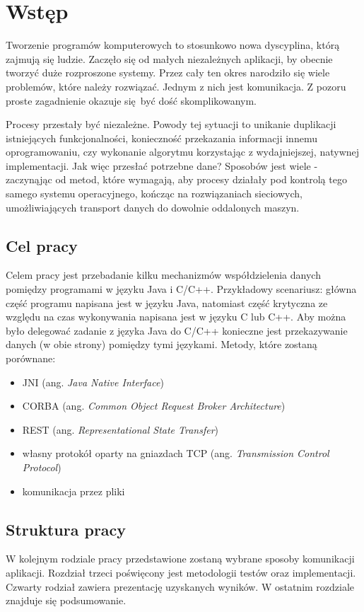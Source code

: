 \chapter{Wstęp}

Tworzenie programów komputerowych to stosunkowo nowa dyscyplina, którą zajmują się ludzie. Zaczęło się od małych niezależnych aplikacji, by obecnie tworzyć duże rozproszone systemy. Przez cały ten okres narodziło się wiele problemów, które należy rozwiązać. Jednym z nich jest komunikacja. Z pozoru proste zagadnienie okazuje się być dość skomplikowanym.

Procesy przestały być niezależne. Powody tej sytuacji to unikanie duplikacji istniejących funkcjonalności, konieczność przekazania informacji innemu oprogramowaniu, czy wykonanie algorytmu korzystając z wydajniejszej, natywnej implementacji. Jak więc przesłać potrzebne dane? Sposobów jest wiele - zaczynąjąc od metod, które wymagają, aby procesy działały pod kontrolą tego samego systemu operacyjnego, kończąc na rozwiązaniach sieciowych, umożliwiających transport danych do dowolnie oddalonych maszyn.


\section{Cel pracy}

Celem pracy jest przebadanie kilku mechanizmów współdzielenia  danych pomiędzy programami w języku Java i C/C++. 
Przykładowy scenariusz: główna część programu napisana jest w języku Java, natomiast część krytyczna ze względu na czas wykonywania napisana jest w języku C lub C++. Aby można było delegować zadanie z języka Java do C/C++ konieczne jest przekazywanie danych (w obie strony) pomiędzy tymi językami. Metody, które zostaną porównane:
\begin{itemize}
    \item JNI (ang. \textit{Java Native Interface})
    \item CORBA (ang. \textit{Common Object Request Broker Architecture})
    \item REST (ang. \textit{Representational State Transfer})
    \item własny protokół oparty na gniazdach TCP (ang. \textit{Transmission Control Protocol})
    \item komunikacja przez pliki
\end{itemize}


\section{Struktura pracy}

W kolejnym rodziale pracy przedstawione zostaną wybrane sposoby komunikacji aplikacji.
Rozdział trzeci poświęcony jest metodologii testów oraz implementacji.
Czwarty rodział zawiera prezentację uzyskanych wyników.
W ostatnim rozdziale znajduje się podsumowanie.
